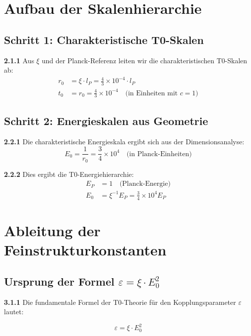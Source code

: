 \documentclass[12pt,a4paper]{article}
\newcommand{\lP}{l_P}
\newcommand{\EP}{E_P}
\newcommand{\rzero}{r_0}
\newcommand{\tzero}{t_0}
\newcommand{\Ezero}{E_0}
\newcommand{\xipar}{\xi}
\begin{document}
	\section{Aufbau der Skalenhierarchie}
	
	\subsection{Schritt 1: Charakteristische T0-Skalen}
	
	\noindent \textbf{2.1.1} Aus $\xipar$ und der Planck-Referenz leiten wir die charakteristischen T0-Skalen ab:
	\begin{align}
		\rzero &= \xipar \cdot \lP = \frac{4}{3} \times 10^{-4} \cdot \lP \\
		\tzero &= \rzero = \frac{4}{3} \times 10^{-4} \quad \text{(in Einheiten mit } c=1\text{)}
	\end{align}
	
	\subsection{Schritt 2: Energieskalen aus Geometrie}
	
	\noindent \textbf{2.2.1} Die charakteristische Energieskala ergibt sich aus der Dimensionsanalyse:
	\begin{equation}
		\Ezero = \frac{1}{\rzero} = \frac{3}{4} \times 10^{4} \quad \text{(in Planck-Einheiten)}
	\end{equation}
	
	\noindent \textbf{2.2.2} Dies ergibt die T0-Energiehierarchie:
	\begin{align}
		\EP &= 1 \quad \text{(Planck-Energie)} \\
		\Ezero &= \xipar^{-1} \EP = \frac{3}{4} \times 10^{4} \EP
	\end{align}
	
	\section{Ableitung der Feinstrukturkonstanten}
	
	\subsection{Ursprung der Formel $\varepsilon = \xipar \cdot \Ezero^2$}
	
	\noindent \textbf{3.1.1} Die fundamentale Formel der T0-Theorie für den Kopplungsparameter $\varepsilon$ lautet:
	\begin{keyresult}
		\begin{equation}
			\boxed{\varepsilon = \xipar \cdot \Ezero^2}
			\label{eq:epsilon_definition}
		\end{equation}
	\end{keyresult}
	
\end{document}
